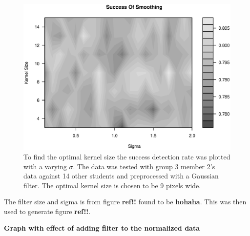\begin{figure}
\centering
\includegraphics[width = \textwidth]{graphics/success_of_smoothing_contour}
\caption[Optimal smoothing]{To find the optimal kernel size the success detection rate was plotted with a varying $\sigma$.
The data was tested with group 3 member 2's data against 14 other students and preprocessed with a Gaussian filter. 
The optimal kernel size is chosen to be 9 pixels wide.
}
\end{figure}

The filter size and sigma is from figure \textbf{ref!!} found to be \textbf{hohaha}.
This was then used to generate figure \textbf{ref!!}.

\textbf{Graph with effect of adding filter to the normalized data}



